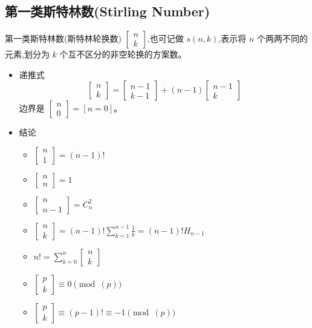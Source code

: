 \subsection{第一类斯特林数(Stirling Number)}
第一类斯特林数(斯特林轮换数) 
 $\begin{bmatrix}n\\ k\end{bmatrix}$,也可记做 $s(n,k)$,表示将 $n$ 个两两不同的元素,划分为 $k$ 个互不区分的非空轮换的方案数。

\begin{itemize}
    \item 递推式
	$$\begin{bmatrix}n\\ k\end{bmatrix}=\begin{bmatrix}n-1\\ k-1\end{bmatrix}+(n-1)\begin{bmatrix}n-1\\ k\end{bmatrix}$$
			边界是  $\begin{bmatrix}n\\ 0\end{bmatrix}=[n=0]$。
    \item 结论
    \begin{itemize}
        \item $\begin{bmatrix}n\\ 1\end{bmatrix} = (n-1)!$
        \item $\begin{bmatrix}n\\ n\end{bmatrix} = 1$
        \item $\begin{bmatrix}n\\ n-1\end{bmatrix} = C_n^2$
        \item $\begin{bmatrix}n\\ k\end{bmatrix} = (n-1)! \displaystyle\sum^{n-1}_{k=1}\frac{1}{k}=(n-1)!H_{n-1}$
        \item $n! = \displaystyle\sum^n_{k = 0}\begin{bmatrix}n\\ k\end{bmatrix}$
        \item $\begin{bmatrix}p\\ k\end{bmatrix} \equiv 0 \pmod(p)$
        \item $\begin{bmatrix}p\\ k\end{bmatrix} \equiv(p-1)!\equiv -1 \pmod(p)$
    \end{itemize}
\end{itemize}

